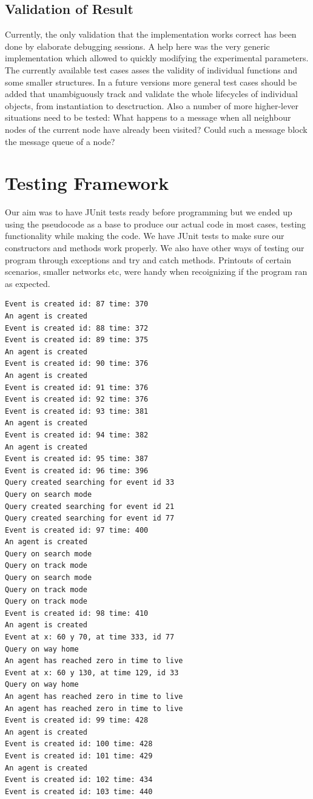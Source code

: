 \documentclass[a4paper,11pt,twoside]{article}
\begin{document}
\subsection{Validation of Result}
Currently, the only validation that the implementation works correct
has been done by elaborate debugging sessions. A help here was the
very generic implementation which allowed to quickly modifying the
experimental parameters. The currently available test cases asses the
validity of individual functions and some smaller structures. In a
future versions more general test cases should be added that
unambiguously track and validate the whole lifecycles of individual
objects, from instantiation to desctruction. 
Also a number of more higher-lever situations need to be tested: What
happens to a message when all neighbour nodes of the current node have
already been visited? Could such a message block the message queue of
a node?   



\section{Testing Framework}

Our aim was to have JUnit tests ready before programming but we ended
up using the pseudocode as a base to produce our actual code in most
cases, testing functionality while making the code. We have JUnit
tests to make sure our constructors and methods work properly. We also
have other ways of testing our program through exceptions and try and
catch methods. Printouts of certain scenarios, smaller networks etc,
were handy when recoignizing if the program ran as expected. 

\begin{verbatim}
Event is created id: 87 time: 370
An agent is created
Event is created id: 88 time: 372
Event is created id: 89 time: 375
An agent is created
Event is created id: 90 time: 376
An agent is created
Event is created id: 91 time: 376
Event is created id: 92 time: 376
Event is created id: 93 time: 381
An agent is created
Event is created id: 94 time: 382
An agent is created
Event is created id: 95 time: 387
Event is created id: 96 time: 396
Query created searching for event id 33
Query on search mode
Query created searching for event id 21
Query created searching for event id 77
Event is created id: 97 time: 400
An agent is created
Query on search mode
Query on track mode
Query on search mode
Query on track mode
Query on track mode
Event is created id: 98 time: 410
An agent is created
Event at x: 60 y 70, at time 333, id 77
Query on way home
An agent has reached zero in time to live
Event at x: 60 y 130, at time 129, id 33
Query on way home
An agent has reached zero in time to live
An agent has reached zero in time to live
Event is created id: 99 time: 428
An agent is created
Event is created id: 100 time: 428
Event is created id: 101 time: 429
An agent is created
Event is created id: 102 time: 434
Event is created id: 103 time: 440
\end{verbatim}
\end{document}
